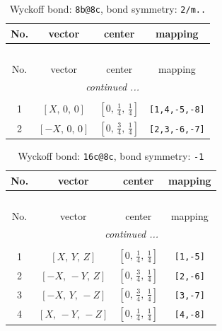 \documentclass[fleqn,8pt]{jsarticle}
\begin{document}
\renewcommand{\arraystretch}{1.2}
\begin{longtable}{cccc}
\caption{Wyckoff bond: {\tt 8b@8c}, bond symmetry: {\tt 2/m..}}
 \\
 \hline \hline
No. & vector & center & mapping \\ \hline \endfirsthead

\multicolumn{3}{l}{\tablename\ \thetable{}} \\
 \hline \hline
No. & vector & center & mapping \\ \hline \endhead

 \hline \hline
\multicolumn{3}{r}{\footnotesize\it continued ...} \\ \endfoot

 \hline \hline
\multicolumn{3}{r}{} \\ \endlastfoot

1 & $\left[ X,\, 0,\, 0 \right]$ & $\left[ 0,\, \frac{1}{4},\, \frac{1}{4} \right]$ & {\tt [1,4,-5,-8]} \\ \hline
2 & $\left[ - X,\, 0,\, 0 \right]$ & $\left[ 0,\, \frac{3}{4},\, \frac{1}{4} \right]$ & {\tt [2,3,-6,-7]} \\
\end{longtable}
\renewcommand{\arraystretch}{1.2}
\begin{longtable}{cccc}
\caption{Wyckoff bond: {\tt 16c@8c}, bond symmetry: {\tt -1}}
 \\
 \hline \hline
No. & vector & center & mapping \\ \hline \endfirsthead

\multicolumn{3}{l}{\tablename\ \thetable{}} \\
 \hline \hline
No. & vector & center & mapping \\ \hline \endhead

 \hline \hline
\multicolumn{3}{r}{\footnotesize\it continued ...} \\ \endfoot

 \hline \hline
\multicolumn{3}{r}{} \\ \endlastfoot

1 & $\left[ X,\, Y,\, Z \right]$ & $\left[ 0,\, \frac{1}{4},\, \frac{1}{4} \right]$ & {\tt [1,-5]} \\ \hline
2 & $\left[ - X,\, - Y,\, Z \right]$ & $\left[ 0,\, \frac{3}{4},\, \frac{1}{4} \right]$ & {\tt [2,-6]} \\ \hline
3 & $\left[ - X,\, Y,\, - Z \right]$ & $\left[ 0,\, \frac{3}{4},\, \frac{1}{4} \right]$ & {\tt [3,-7]} \\ \hline
4 & $\left[ X,\, - Y,\, - Z \right]$ & $\left[ 0,\, \frac{1}{4},\, \frac{1}{4} \right]$ & {\tt [4,-8]} \\
\end{longtable}
\end{document}
